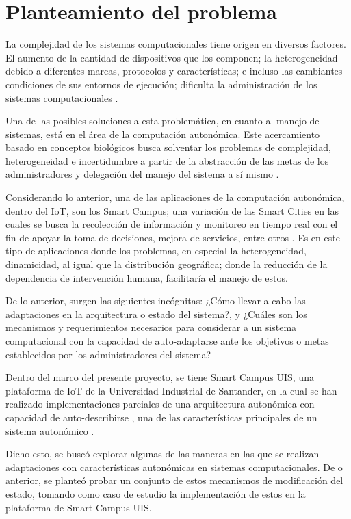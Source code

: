 \section{Planteamiento del problema}

La complejidad de los sistemas computacionales tiene origen en diversos factores. El aumento de la cantidad de dispositivos que los componen; la heterogeneidad debido a diferentes marcas, protocolos y características; e incluso las cambiantes condiciones de sus entornos de ejecución; dificulta la administración de los sistemas computacionales \cite{emerging_2005}.

Una de las posibles soluciones a esta problemática, en cuanto al manejo de sistemas, está en el área de la computación autonómica. Este acercamiento basado en conceptos biológicos busca solventar los problemas de complejidad, heterogeneidad e incertidumbre \cite{emerging_2005} a partir de la abstracción de las metas de los administradores y delegación del manejo del sistema a sí mismo \cite{lalanda_diaconescu_mccann_2014}.

Considerando lo anterior, una de las aplicaciones de la computación autonómica, dentro del IoT, son los Smart Campus; una variación de las Smart Cities en las cuales se busca la recolección de información y monitoreo en tiempo real con el fin de apoyar la toma de decisiones, mejora de servicios, entre otros \cite{MinAllah2020}. Es en este tipo de aplicaciones donde los problemas, en especial la heterogeneidad, dinamicidad, al igual que la distribución geográfica; donde la reducción de la dependencia de intervención humana, facilitaría el manejo de estos. 

De lo anterior, surgen las siguientes incógnitas: ¿Cómo llevar a cabo las adaptaciones en la arquitectura o estado del sistema?, y ¿Cuáles son los mecanismos y requerimientos necesarios para considerar a un sistema computacional con la capacidad de auto-adaptarse ante los objetivos o metas establecidos por los administradores del sistema?

Dentro del marco del presente proyecto, se tiene Smart Campus UIS, una plataforma de IoT de la Universidad Industrial de Santander, en la cual se han realizado implementaciones parciales de una arquitectura autonómica con capacidad de auto-describirse \cite{msc_henry_2022}, una de las características principales de un sistema autonómico \cite{horn_2001}. 

Dicho esto, se buscó explorar algunas de las maneras en las que se realizan adaptaciones con características autonómicas en sistemas computacionales. De o anterior, se planteó probar un conjunto de estos mecanismos de modificación del estado, tomando como caso de estudio la implementación de estos en la plataforma de Smart Campus UIS.